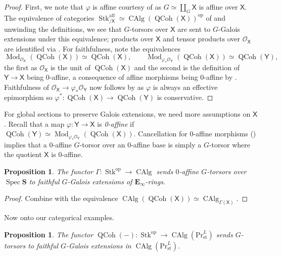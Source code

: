 \documentclass[11pt, a4paper]{article}
\newcommand{\aff}{\mathrm{aff}}
\newcommand{\st}{\mathrm{st}}
\DeclareMathOperator{\Spec}{Spec}
\newcommand{\1}{\mathbf{1}}
\newcommand{\Sph}{\mathbf{S}}
\DeclareMathOperator{\CAlg}{CAlg}
\newcommand{\PrLst}{{\mathrm{Pr}^L_\st}}
\DeclareMathOperator{\Mod}{Mod}
\DeclareMathOperator{\QCoh}{QCoh}
\DeclareMathOperator{\Stk}{Stk}
\newcommand{\op}{\mathrm{op}}
\newcommand{\E}{\mathbf{E}}
\renewcommand{\O}{\mathcal{O}}
\newcommand{\X}{\mathsf{X}}
\newcommand{\Y}{\mathsf{Y}}
\newcommand{\Ga}{\Gamma}
\theoremstyle{plain}
\newtheorem{prop}[equation]{Proposition}
\theoremstyle{definition}
\theoremstyle{remark}\numberwithin{equation}{section}
\begin{document}
\begin{proof}
    First, we note that $\varphi$ is affine courtesy of  as $G \simeq \coprod_G \X$ is affine over $\X$. The equivalence of categories $\Stk^\aff_{/\X} \simeq \CAlg(\QCoh(\X))^\op$ of \cite[Th.2.2.3.1]{reconstruction} and unwinding the definitions, we see that $G$-torsors over $\X$ are sent to $G$-Galois extensions under this equivalence; products over $\X$ and tensor products over $\O_\X$ are identified via \cite[Pr.2.2.1.11(3)]{reconstruction}. For faithfulness, note the equivalences
    \[\Mod_{\O_\X}(\QCoh(\X)) \simeq \QCoh(\X), \qquad \Mod_{\varphi_\ast \O_\Y}(\QCoh(\X)) \simeq \QCoh(\Y),\]
    the first as $\O_\X$ is the unit of $\QCoh(\X)$ and the second is the definition of $\Y \to \X$ being $0$-affine, a consequence of affine morphisms being $0$-affine by \cite[Pr.2.2.2.5]{reconstruction}. Faithfulness of $\O_\X \to \varphi_\ast \O_\Y$ now follows by  as $\varphi$ is always an effective epimorphism so $\varphi^\ast \colon \QCoh(\X) \to \QCoh(\Y)$ is conservative.
\end{proof}

For global sections to preserve Galois extensions, we need more assumptions on $\X$. Recall that a map $\varphi \colon \Y \to \X$ is \emph{0-affine} if $\QCoh(\Y) \simeq \Mod_{\varphi_\ast \O_\Y} (\QCoh(\X))$. Cancellation for 0-affine morphisms (\cite[Pr.2.2.1.6]{reconstruction}) implies that a 0-affine $G$-torsor over an 0-affine base is simply a $G$-torsor where the quotient $\X$ is 0-affine.

\begin{prop}\label{cor:0semiaffine_gives_galoisextension}
    The functor $\Ga \colon \Stk^\op \to \CAlg$ sends $0$-affine $G$-torsors over $\Spec \Sph$ to faithful $G$-Galois extensions of $\E_\infty$-rings.
\end{prop}

\begin{proof}
    Combine  with the equivalence $\CAlg(\QCoh(\X)) \simeq \CAlg_{\Ga(\X)}$.
\end{proof}

Now onto our categorical examples.

\begin{prop}\label{pr:torsor_to_Galois_inPRL}
    The functor $\QCoh(-) \colon \Stk^\op \to \CAlg(\PrLst)$ sends $G$-torsors to faithful $G$-Galois extensions in $\CAlg(\PrLst)$.
\end{prop}
\end{document}
